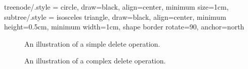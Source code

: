 \tikzset
{
    treenode/.style = {circle, draw=black, align=center, minimum size=1cm},
    subtree/.style  = {isosceles triangle, draw=black, align=center, minimum height=0.5cm, minimum width=1cm, shape border rotate=90, anchor=north}
}
\begin{figure}[t]
\centering

\caption{An illustration of a simple delete operation. \label{fig:simple}}
{
	\begin{tikzpicture}[scale=0.6, transform shape]
	
	\end{tikzpicture}
}

\caption{An illustration of a complex delete operation. \label{fig:complex}}
{
	\begin{tikzpicture}[scale=0.6, transform shape]
	
	\end{tikzpicture}
}

\end{figure}